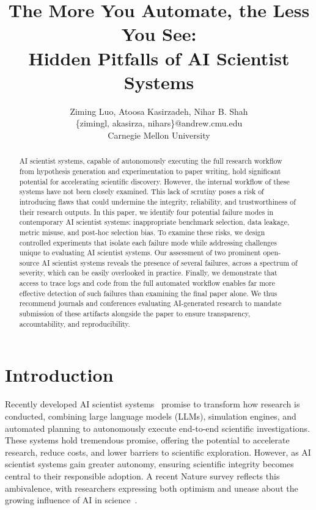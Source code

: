 \documentclass[10pt]{article}
\title{The More You Automate, the Less You See:\\Hidden Pitfalls of AI Scientist Systems}
\author{Ziming Luo, Atoosa Kasirzadeh, Nihar B. Shah \\\{zimingl, akasirza, nihars\}@andrew.cmu.edu\\Carnegie Mellon University}
\date{}
\begin{document}
\maketitle

\begin{abstract}
\noindent AI scientist systems, capable of autonomously executing the full research workflow from hypothesis generation and experimentation to paper writing, hold significant potential for accelerating scientific discovery. However, the internal workflow of these systems have not been closely examined. 
This lack of scrutiny poses a risk of introducing flaws that could undermine the integrity, reliability, and trustworthiness of their research outputs.
In this paper, we identify four potential failure modes in contemporary AI scientist systems: inappropriate benchmark selection, data leakage, metric misuse, and post-hoc selection bias. To examine these risks, we design controlled experiments that isolate each failure mode while addressing challenges unique to evaluating AI scientist systems. Our assessment of two prominent open-source AI scientist systems reveals the presence of several failures, across a spectrum of severity, which can be easily overlooked in practice. Finally, we demonstrate that access to trace logs and code from the full automated workflow enables far more effective detection of such failures than examining the final paper alone. We thus recommend journals and conferences evaluating AI-generated research to mandate submission of these artifacts alongside the paper to ensure transparency, accountability, and reproducibility.
\end{abstract}



\section{Introduction}

\label{sec:intro}

Recently developed AI scientist systems~\citep{luo2025llm4sr,lu2024aiscientistfullyautomated} promise to transform how research is conducted, combining large language models (LLMs), simulation engines, and automated planning to autonomously execute end-to-end scientific investigations. These systems hold tremendous promise, offering the potential to accelerate research, reduce costs, and lower barriers to scientific exploration. However, as AI scientist systems gain greater autonomy, ensuring scientific integrity becomes central to their responsible adoption. A recent Nature survey reflects this ambivalence, with researchers expressing both optimism and unease about the growing influence of AI in science~\citep{van2023ai}.  
\end{document}
